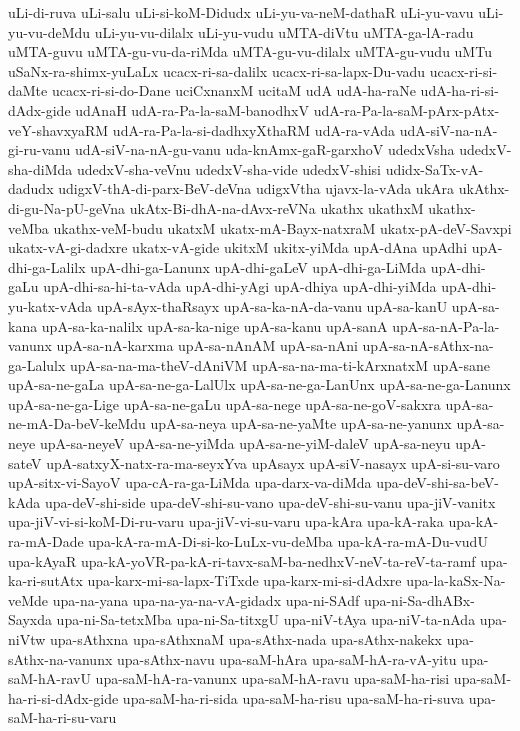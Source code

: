 {uLi-di-ruva
uLi-salu
uLi-si-koM-Didudx
uLi-yu-va-neM-dathaR
uLi-yu-vavu
uLi-yu-vu-deMdu
uLi-yu-vu-dilalx
uLi-yu-vudu
uMTA-diVtu
uMTA-ga-lA-radu
uMTA-guvu
uMTA-gu-vu-da-riMda
uMTA-gu-vu-dilalx
uMTA-gu-vudu
uMTu
uSaNx-ra-shimx-yuLaLx
ucacx-ri-sa-dalilx
ucacx-ri-sa-lapx-Du-vadu
ucacx-ri-si-daMte
ucacx-ri-si-do-Dane
uciCxnanxM
ucitaM
udA
udA-ha-raNe
udA-ha-ri-si-dAdx-gide
udAnaH
udA-ra-Pa-la-saM-banodhxV
udA-ra-Pa-la-saM-pArx-pAtx-veY-shavxyaRM
udA-ra-Pa-la-si-dadhxyXthaRM
udA-ra-vAda
udA-siV-na-nA-gi-ru-vanu
udA-siV-na-nA-gu-vanu
uda-knAmx-gaR-garxhoV
udedxVsha
udedxV-sha-diMda
udedxV-sha-veVnu
udedxV-sha-vide
udedxV-shisi
udidx-SaTx-vA-dadudx
udigxV-thA-di-parx-BeV-deVna
udigxVtha
ujavx-la-vAda
ukAra
ukAthx-di-gu-Na-pU-geVna
ukAtx-Bi-dhA-na-dAvx-reVNa
ukathx
ukathxM
ukathx-veMba
ukathx-veM-budu
ukatxM
ukatx-mA-Bayx-natxraM
ukatx-pA-deV-Savxpi
ukatx-vA-gi-dadxre
ukatx-vA-gide
ukitxM
ukitx-yiMda
upA-dAna
upAdhi
upA-dhi-ga-Lalilx
upA-dhi-ga-Lanunx
upA-dhi-gaLeV
upA-dhi-ga-LiMda
upA-dhi-gaLu
upA-dhi-sa-hi-ta-vAda
upA-dhi-yAgi
upA-dhiya
upA-dhi-yiMda
upA-dhi-yu-katx-vAda
upA-sAyx-thaRsayx
upA-sa-ka-nA-da-vanu
upA-sa-kanU
upA-sa-kana
upA-sa-ka-nalilx
upA-sa-ka-nige
upA-sa-kanu
upA-sanA
upA-sa-nA-Pa-la-vanunx
upA-sa-nA-karxma
upA-sa-nAnAM
upA-sa-nAni
upA-sa-nA-sAthx-na-ga-Lalulx
upA-sa-na-ma-theV-dAniVM
upA-sa-na-ma-ti-kArxnatxM
upA-sane
upA-sa-ne-gaLa
upA-sa-ne-ga-LalUlx
upA-sa-ne-ga-LanUnx
upA-sa-ne-ga-Lanunx
upA-sa-ne-ga-Lige
upA-sa-ne-gaLu
upA-sa-nege
upA-sa-ne-goV-sakxra
upA-sa-ne-mA-Da-beV-keMdu
upA-sa-neya
upA-sa-ne-yaMte
upA-sa-ne-yanunx
upA-sa-neye
upA-sa-neyeV
upA-sa-ne-yiMda
upA-sa-ne-yiM-daleV
upA-sa-neyu
upA-sateV
upA-satxyX-natx-ra-ma-seyxYva
upAsayx
upA-siV-nasayx
upA-si-su-varo
upA-sitx-vi-SayoV
upa-cA-ra-ga-LiMda
upa-darx-va-diMda
upa-deV-shi-sa-beV-kAda
upa-deV-shi-side
upa-deV-shi-su-vano
upa-deV-shi-su-vanu
upa-jiV-vanitx
upa-jiV-vi-si-koM-Di-ru-varu
upa-jiV-vi-su-varu
upa-kAra
upa-kA-raka
upa-kA-ra-mA-Dade
upa-kA-ra-mA-Di-si-ko-LuLx-vu-deMba
upa-kA-ra-mA-Du-vudU
upa-kAyaR
upa-kA-yoVR-pa-kA-ri-tavx-saM-ba-nedhxV-neV-ta-reV-ta-ramf
upa-ka-ri-sutAtx
upa-karx-mi-sa-lapx-TiTxde
upa-karx-mi-si-dAdxre
upa-la-kaSx-Na-veMde
upa-na-yana
upa-na-ya-na-vA-gidadx
upa-ni-SAdf
upa-ni-Sa-dhABx-Sayxda
upa-ni-Sa-tetxMba
upa-ni-Sa-titxgU
upa-niV-tAya
upa-niV-ta-nAda
upa-niVtw
upa-sAthxna
upa-sAthxnaM
upa-sAthx-nada
upa-sAthx-nakekx
upa-sAthx-na-vanunx
upa-sAthx-navu
upa-saM-hAra
upa-saM-hA-ra-vA-yitu
upa-saM-hA-ravU
upa-saM-hA-ra-vanunx
upa-saM-hA-ravu
upa-saM-ha-risi
upa-saM-ha-ri-si-dAdx-gide
upa-saM-ha-ri-sida
upa-saM-ha-risu
upa-saM-ha-ri-suva
upa-saM-ha-ri-su-varu
}
